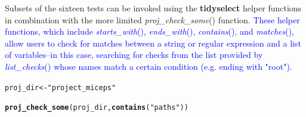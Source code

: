 \documentclass[APA,LATO1COL]{WileyNJD-v2}\usepackage[]{graphicx}\usepackage[]{color}
\makeatletter
\newcommand{\hlstr}[1]{\textcolor[rgb]{0.192,0.494,0.8}{#1}}%
\newcommand{\hlstd}[1]{\textcolor[rgb]{0.345,0.345,0.345}{#1}}%
\newcommand{\hlkwb}[1]{\textcolor[rgb]{0.69,0.353,0.396}{#1}}%
\newcommand{\hlkwd}[1]{\textcolor[rgb]{0.737,0.353,0.396}{\textbf{#1}}}%
\newenvironment{kframe}{%
 \def\at@end@of@kframe{}%
 \ifinner\ifhmode%
  \def\at@end@of@kframe{\end{minipage}}%
  \begin{minipage}{\columnwidth}%
 \fi\fi%
 \def\FrameCommand##1{\hskip\@totalleftmargin \hskip-\fboxsep
 \colorbox{shadecolor}{##1}\hskip-\fboxsep
     \hskip-\linewidth \hskip-\@totalleftmargin \hskip\columnwidth}%
 \MakeFramed {\advance\hsize-\width
   \@totalleftmargin\z@ \linewidth\hsize
   \@setminipage}}%
 {\par\unskip\endMakeFramed%
 \at@end@of@kframe}
\newenvironment{knitrout}{}{} %
\newcommand{\pkg}[1]{\textbf{#1}}
\newcommand{\func}[1]{\textit{#1}()}
\makeatother
\begin{document}
Subsets of the sixteen tests can be invoked using the \pkg{tidyselect} helper functions \citep{R-tidyselect} in combination with the more limited \func{proj\_check\_some} function. \textcolor{blue}{These helper functions, which include \func{starts\_with}, \func{ends\_with}, \func{contains}, and \func{matches}, allow users to check for matches between a string or regular expression and a list of variables--in this case, searching for checks from the list provided by \func{list\_checks} whose names match a certain condition (e.g. ending with "root")}.

\begin{knitrout}
\color{fgcolor}\begin{kframe}
\begin{alltt}
\hlstd{proj_dir} \hlkwb{<-} \hlstr{"project_miceps"}
\end{alltt}
\end{kframe}
\end{knitrout}




\begin{knitrout}
\color{fgcolor}\begin{kframe}
\begin{alltt}
\hlkwd{proj_check_some}\hlstd{(proj_dir,} \hlkwd{contains}\hlstd{(}\hlstr{"paths"}\hlstd{))}
\end{alltt}


{\ttfamily\noindent\itshape\color{messagecolor}{\#\# -- Compiling... ---------------------------------------------- fertile 0.0.0.9027 --}}

{\ttfamily\noindent\itshape\color{messagecolor}{\#\# -- Rendering R scripts... ------------------------------------ fertile 0.0.0.9027 --}}

{\ttfamily\noindent\itshape\color{messagecolor}{\#\# -- Running reproducibility checks ---------------------------- fertile 0.0.0.9027 --}}

{\ttfamily\noindent\itshape\color{messagecolor}{\#\# v Checking for no absolute paths}}

{\ttfamily\noindent\itshape\color{messagecolor}{\#\# v Checking for only portable paths}}\end{kframe}
\begin{kframe}

{\ttfamily\noindent\itshape\color{messagecolor}{\#\# -- Summary of fertile checks --------------------------------- fertile 0.0.0.9027 --}}\end{kframe}
\begin{kframe}

{\ttfamily\noindent\itshape\color{messagecolor}{\#\# v Reproducibility checks passed: 2}}\end{kframe}
\end{knitrout}
\end{document}

